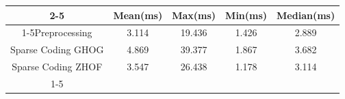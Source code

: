 \documentclass{standalone}
\begin{document}
 
 \begin{tabular}{|c |c |c |c |c |}
\cline{2-5}\cline{2-5} \multicolumn{1}{c |}{ } & Mean(ms) & Max(ms) & Min(ms) & Median(ms)\\ 
\cline{1-5}Preprocessing & 3.114 & 19.436 & 1.426 & 2.889\\ 
 \hhline{|=|=|=|=|=|}Sparse Coding GHOG & 4.869 & 39.377 & 1.867 & 3.682\\ 
 \hhline{|=|=|=|=|=|}Sparse Coding ZHOF & 3.547 & 26.438 & 1.178 & 3.114\\ 
 \cline{1-5}\hline \end{tabular}
 
\end{document}
